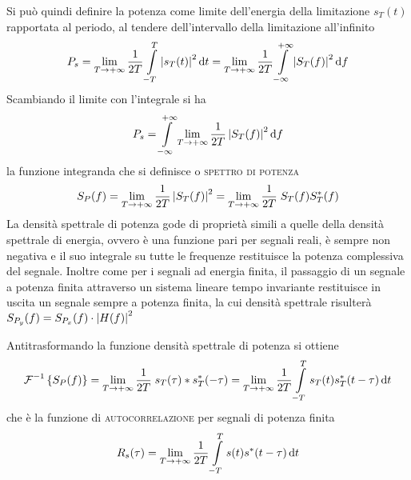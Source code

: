 Si può quindi definire la potenza come limite dell'energia della limitazione $s_T(t)$ rapportata al periodo, al tendere dell'intervallo della limitazione all'infinito
\[P_s=\lim\limits_{T\to+\infty}{\frac{1}{2T}\int\limits_{-T}^{T}{\left|{s_T(t)}\right|^2}{\,\mathop{}\!\mathrm{d}{t}}}=\lim\limits_{T\to+\infty}{\frac{1}{2T}\int\limits_{-\infty}^{+\infty}{\left|{S_T(f)}\right|^2}{\,\mathop{}\!\mathrm{d}{f}}}\]
Scambiando il limite con l'integrale si ha
\[P_s=\int\limits_{-\infty}^{+\infty}{\lim\limits_{T\to+\infty}\frac{1}{2T}\left|{S_T(f)}\right|^2}{\,\mathop{}\!\mathrm{d}{f}}\]
la funzione integranda che si definisce  o \textsc{spettro di potenza}
\begin{equation}
S_P(f)=\lim\limits_{T\to+\infty}{\frac{1}{2T}\left|{S_T(f)}\right|^2}=\lim\limits_{T\to+\infty}{\frac{1}{2T}\;S_T(f)S_{T}^\ast(f)}
\end{equation}
La densità spettrale di potenza gode di proprietà simili a quelle della densità spettrale di energia, ovvero è una funzione pari per segnali reali, è sempre non negativa e il suo integrale su tutte le frequenze restituisce la potenza complessiva del segnale.
Inoltre come per i segnali ad energia finita, il passaggio di un segnale a potenza finita attraverso un sistema lineare tempo invariante restituisce in uscita un segnale sempre a potenza finita, la cui densità spettrale risulterà $S_{P_y}(f)=S_{P_x}(f)\cdot\left|{H(f)}\right|^2$

Antitrasformando la funzione densità spettrale di potenza si ottiene
\[\operatorname{\mathcal{F}}^{-1}\left\lbrace{S_P(f)}\right\rbrace=\lim\limits_{T\to+\infty}{\frac{1}{2T}\;s_T(\tau)\ast s_{T}^\ast(-\tau)}=\lim\limits_{T\to+\infty}{\frac{1}{2T}\int\limits_{-T}^{T}{s_T(t)s_{T}^\ast(t-\tau)}{\,\mathop{}\!\mathrm{d}{t}}}\]
che è la funzione di \textsc{autocorrelazione} per segnali di potenza finita
\begin{equation}R_s(\tau)=\lim\limits_{T\to+\infty}{\frac{1}{2T}\int\limits_{-T}^{T}{s(t){s}^\ast(t-\tau)}{\,\mathop{}\!\mathrm{d}{t}}}\end{equation}

